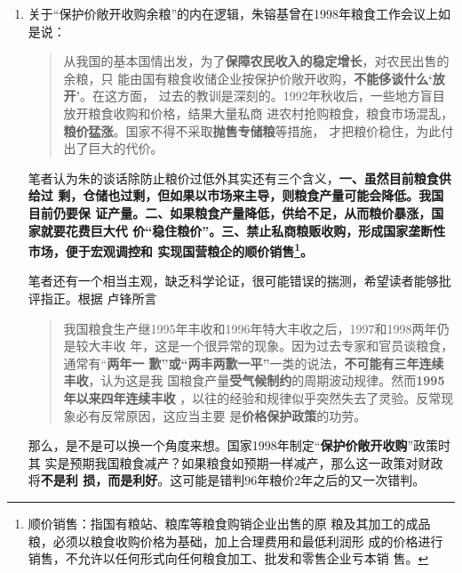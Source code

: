 \begin{enumerate}
\item 关于“保护价敞开收购余粮”的内在逻辑，朱镕基曾在1998年粮食工作会议上如是说：
  \begin{quotation}
    从我国的基本国情出发，为了\textbf{保障农民收入的稳定增长}，对农民出售的余粮，只
    能由国有粮食收储企业按保护价敞开收购，\textbf{不能侈谈什么‘放开’}。在这方面，
    过去的教训是深刻的。1992年秋收后，一些地方盲目放开粮食收购和价格，结果大量私商
    进农村抢购粮食，粮食市场混乱，\textbf{粮价猛涨}。国家不得不采取\textbf{抛售专储粮}等措施，
    才把粮价稳住，为此付出了巨大的代价。\cite{zhuchangkai}
  \end{quotation}

  笔者认为朱的谈话除防止粮价过低外其实还有三个含义，\textbf{一、虽然目前粮食供给过
    剩，仓储也过剩，但如果以市场来主导，则粮食产量可能会降低。我国目前仍要保
    证产量。二、如果粮食产量降低，供给不足，从而粮价暴涨，国家就要花费巨大代
    价“稳住粮价”。三、禁止私商粮贩收购，形成国家垄断性市场，便于宏观调控和
    实现国营粮企的顺价销售\footnote{顺价销售：指国有粮站、粮库等粮食购销企业出售的原
      粮及其加工的成品粮，必须以粮食收购价格为基础，加上合理费用和最低利润形
      成的价格进行销售，不允许以任何形式向任何粮食加工、批发和零售企业亏本销
      售。}。}


  笔者还有一个相当主观，缺乏科学论证，很可能错误的揣测，希望读者能够批评指正。根据
  卢锋所言
  \begin{quotation}
    我国粮食生产继1995年丰收和1996年特大丰收之后，1997和1998两年仍是较大丰收
    年，这是一个很异常的现象。因为过去专家和官员谈粮食，通常有“\textbf{两年一
      歉”或“两丰两歉一平”}一类的说法，\textbf{不可能有三年连续丰收}，认为这是我
    国粮食产量\textbf{受气候制约}的周期波动规律。然而\textbf{1995年以来四年连续丰收}%
    ，以往的经验和规律似乎突然失去了灵验。反常现象必有反常原因，这应当主要
    是\textbf{价格保护政策}的功劳。
  \end{quotation}
  那么，是不是可以换一个角度来想。国家1998年制定“\textbf{保护价敞开收购}”政策时其
  实是预期我国粮食减产？如果粮食如预期一样减产，那么这一政策对财政将\textbf{不是利
    损，而是利好}。这可能是错判96年粮价2年之后的又一次错判。



\end{enumerate}

